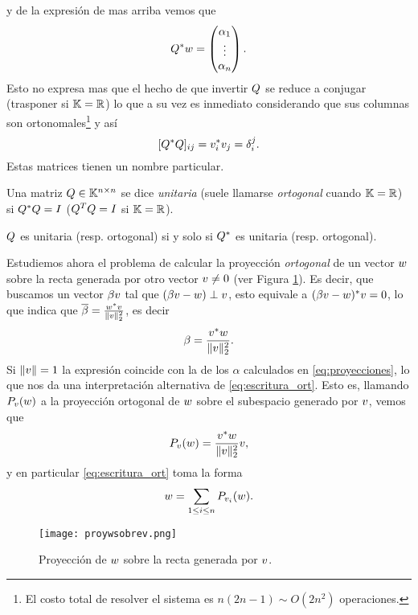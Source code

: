 y de la expresión de mas arriba vemos que
$$
\Qb^*\wb=\begin{pmatrix}
        \alpha_1\\
        \vdots\\
        \alpha_n
       \end{pmatrix}.
$$
Esto no expresa mas que el hecho de que invertir $\Qb$ se reduce a conjugar (trasponer si $\mathbb K=\mathbb R$) lo que a su vez es inmediato considerando que sus columnas son ortonomales\footnote{El costo total de resolver el sistema es $n(2n-1)\sim O(2n^2)$ operaciones. } y así
$$
[\Qb^*\Qb]_{ij}=\vb_i^*\vb_j=\delta_i^j.
$$
Estas matrices tienen un nombre particular.
\begin{defi}
\label{def:de_unitaria}
 Una matriz $\Qb\in \K^{n\times n}$ se dice \emph{unitaria} (suele llamarse \emph{ortogonal} cuando $\mathbb K=\mathbb R$) si
 $\Qb^*\Qb=\Ib$ ($\Qb^T\Qb=\Ib$ si $\mathbb K=\mathbb R$).
\end{defi}
\begin{rem}
$\Qb$ es unitaria (resp. ortogonal) si y solo si $\Qb^*$ es unitaria (resp. ortogonal).
\end{rem}
Estudiemos ahora el problema de calcular la proyección \emph{ortogonal} de un vector $\wb$ sobre la recta generada por otro vector $\vb\neq \cero$ (ver Figura \ref{fig:proyusobrev}).
Es decir, que buscamos un vector $\beta\vb$
 tal que $(\beta\vb -\wb)\perp \vb$, esto equivale a
 $(\beta\vb -\wb)^* \vb=0$, lo que indica que $\overline{\beta}=\frac{\wb^*\vb}{\|\vb\|_2^2}$, es decir
 $$
 \beta=\frac{\vb^*\wb}{\|\vb\|_2^2}.
 $$
 Si $\|\vb\|=1$ la expresión coincide con la de los $\alpha$ calculados en \eqref{eq:proyecciones}, lo que nos da una interpretación alternativa de \eqref{eq:escritura_ort}. Esto es, llamando
 $\Pb_{\vb}(\wb)$ a la proyección ortogonal de $\wb$ sobre el subespacio generado por $\vb$, vemos que
\begin{equation}
 \label{eq:proy_forma1}
 \Pb_{\vb}(\wb)=\frac{\vb^*\wb}{\|\vb\|_2^2}\vb,
\end{equation}
y en particular \eqref{eq:escritura_ort} toma la forma
 $$
 \wb=\sum_{1\le i\le n}\Pb_{\vb_i}(\wb).
 $$

\begin{figure}
\texttt{[image: proywsobrev.png]}
\caption{Proyección de $\wb$ sobre la recta generada por $\vb$.}
 \label{fig:proyusobrev}
\end{figure}

